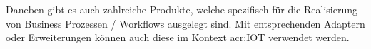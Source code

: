 \newpage
Daneben gibt es auch zahlreiche Produkte, welche spezifisch für die Realisierung von Business Prozessen / Workflows ausgelegt sind. Mit entsprechenden Adaptern oder Erweiterungen können auch diese im Kontext \gls{acr:IOT} verwendet werden.

\begin{itemize}




\end{itemize}




